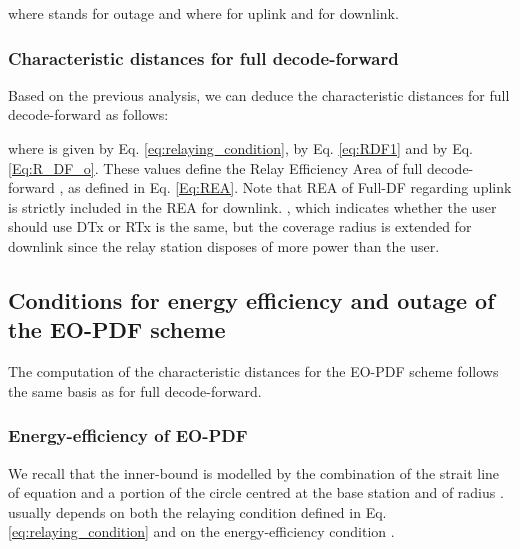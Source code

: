 \documentclass[journal]{IEEEtran}
\theoremstyle{definition}
\begin{document}
where  stands for outage and where  for uplink and  for downlink.


\subsubsection{Characteristic distances for full decode-forward}

Based on the previous analysis, we can deduce the characteristic distances for full decode-forward as follows:

where  is given by Eq. \eqref{eq:relaying_condition},  by Eq. \eqref{eq:RDF1} and  by Eq. \eqref{Eq:R_DF_o}.
These values define the Relay Efficiency Area of full decode-forward , as defined in Eq. \eqref{Eq:REA}.
Note that REA of Full-DF regarding uplink is strictly included in the REA for downlink. , which indicates whether the user should use DTx or RTx is the same, but the coverage radius is extended for downlink since the relay station disposes of more power than the user.



\begin{figure*}[!t]
\setcounter{MYtempeqncnt}{\value{equation}}
\setcounter{equation}{18}
\small{

}
\hrulefill
\setcounter{equation}{\value{MYtempeqncnt}}
\end{figure*}


\subsection{Conditions for energy efficiency and outage of the EO-PDF scheme}

The computation of the characteristic distances for the EO-PDF scheme follows the same basis as for full decode-forward.

\subsubsection{Energy-efficiency of EO-PDF}

We recall that the inner-bound is modelled by the combination of the strait line of equation  and a portion of the circle centred at the base station and of radius .  usually depends on both the relaying condition defined in Eq. \eqref{eq:relaying_condition} and on the energy-efficiency condition .
\end{document}
